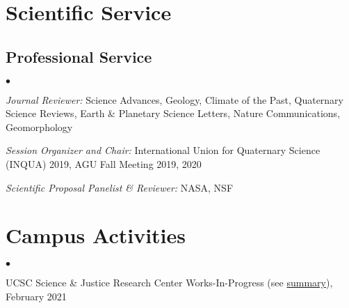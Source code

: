 \documentclass[margin,line]{res}
\newenvironment{list2}{
  \begin{list}{$\bullet$}{%
      \setlength{\itemsep}{0in}
      \setlength{\parsep}{0in} \setlength{\parskip}{0in}
      \setlength{\topsep}{0in} \setlength{\partopsep}{0in} 
      \setlength{\leftmargin}{0.00in}}}{\end{list}}
\begin{document}
\begin{resume}
\section{\sc Scientific Service}

\subsection{\sc Professional Service}
\begin{list2}
\item[]{\em Journal Reviewer:} Science Advances, Geology, Climate of the Past, Quaternary Science Reviews, Earth \& Planetary Science Letters, Nature Communications, Geomorphology
\item[]{\em Session Organizer and Chair:} International Union for Quaternary Science (INQUA) 2019, AGU Fall Meeting 2019, 2020
\item[]{\em Scientific Proposal Panelist \& Reviewer:} NASA, NSF
\end{list2}

\section{\sc Campus Activities } 
\vspace{1.5cm}
\begin{list2}
\item[]       UCSC Science \& Justice Research Center Works-In-Progress (see \href{https://scijust.ucsc.edu/2021/04/08/affiliate-pico/}{summary}), February 2021
\end{list2}


\end{resume}
\end{document}
